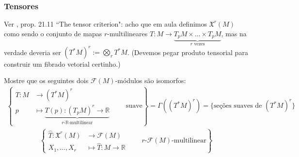\subsubsection{Tensores}

{\color{6}Ver \cite{tud}, prop. 21.11 ``The tensor criterion":} acho que em aula definimos \(\mathfrak{X}^r(M)\) como sendo o conjunto de mapas \(r\)-multilineares \(T:M \to \underbrace{T_pM\times\ldots\times T_pM}_{r\text{ vezes} }\), mas na verdade deveria ser \((T^*M)^r:= \bigotimes_r T^*M\). (Devemos pegar produto tensorial para construir um fibrado vetorial certinho.)

\begin{exercise}\leavevmode
Mostre que os seguintes dois \(\mathcal{F}(M)\)-módulos são isomorfos:
\begin{align*}
	\left\{\begin{aligned}T: M &\longrightarrow (T^*M)^r \\
			p &\longmapsto \underbrace{T(p): (T_pM)^r \longrightarrow \mathbb{R}}_{\text{\(r\)-\(\mathbb{R}\)-multilinear}}
\end{aligned}\qquad \text{suave} \right\}=\Gamma((T^*M)^r)=\{\text{seções suaves de \((T^*M)^r\)} \} 
\end{align*}
\begin{align*}
\left\{ \begin{aligned}
\hat{T}:\mathfrak{X}^r(M) &\longrightarrow\mathcal{F}(M)\\
X_1,\ldots,X_r &  \longmapsto \hat{T}: M \longrightarrow \mathbb{R}
\end{aligned}\qquad \text{\(r\)-\(\mathcal{F}(M)\)-multilinear} \right\} 
\end{align*}
\end{exercise}

